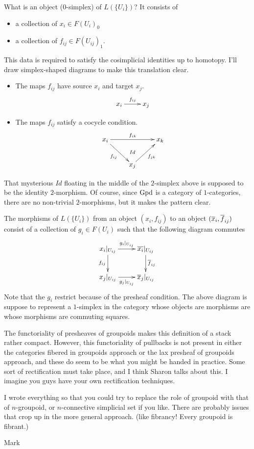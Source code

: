 \smallskip\noindent
What is an object ($0$-simplex) of $L(\{U_i\})$?  It consists of 
\begin{itemize}
\item a collection of $x_i \in F(U_i)_0$
\item a collection of $f_{ij} \in F(U_{ij})_1$.
\end{itemize}
This data is required to satisfy the cosimplicial identities up to
homotopy.  I'll draw simplex-shaped diagrams to make this translation
clear. 
\begin{itemize}
\item The maps $f_{ij}$ have source $x_i$ and target $x_j$.
$$ 
\xymatrix{
x_i \ar[r]^{f_{ij}} & x_j
}
$$
\item The maps $f_{ij}$ satisfy a cocycle condition.
$$
\xymatrix{
x_i \ar[rr]^{f_{ik}} \ar[rd]_{f_{ij}} & \ar@{}[d]|{Id} & x_k
\\
& x_j \ar[ru]_{f_{jk}} 
}
$$
\end{itemize}
That mysterious $Id$ floating in the middle of the $2$-simplex above is
supposed to be the identity $2$-morphism.  Of course, since $\operatorname{Gpd}$ is a
category of $1$-categories, there are no non-trivial $2$-morphisms, but it
makes the pattern clear.

\smallskip\noindent
The morphisms of $L(\{U_i\})$ from an object $(x_i, f_{ij})$ to an object
$(\overline{x}_i, \overline{f}_{ij})$ consist of a collection of $g_i \in F(U_i)$ such
that the following diagram commutes
$$
\xymatrix{
x_i\vert_{U_{ij}} \ar[r]^{g_i\vert_{U_{ij}}} \ar[d]_{f_{ij}} & 
\br{x_i}\vert_{U_{ij}} \ar[d]^{\br{f}_{ij}}
\\
x_j\vert_{U_{ij}} \ar[r]_{g_j\vert_{U_{ij}}} &
\br{x}_j\vert_{U_{ij}}
}
$$
Note that the $g_i$ restrict because of the presheaf condition.  The above
diagram is suppose to represent a $1$-simplex in the category whose objects
are morphisms are whose morphisms are commuting squares.

\smallskip\noindent
The functoriality of presheaves of groupoids makes this definition of a
stack rather
compact.  However, this functoriality of pullbacks is not present in either
the categories fibered in groupoids approach or the lax presheaf of
groupoids approach, and these do seem to be what you might be handed in
practice.  Some sort of rectification must take place, and I think Sharon
talks about this.  I imagine you guys have your own rectification
techniques.

\smallskip\noindent
I wrote everything so that you could try to replace the role of groupoid
with that of $n$-groupoid, or $n$-connective simplicial set if you like.
There are probably issues that crop up in the more general approach. (like
fibrancy!  Every groupoid is fibrant.)

\medskip\noindent
Mark







